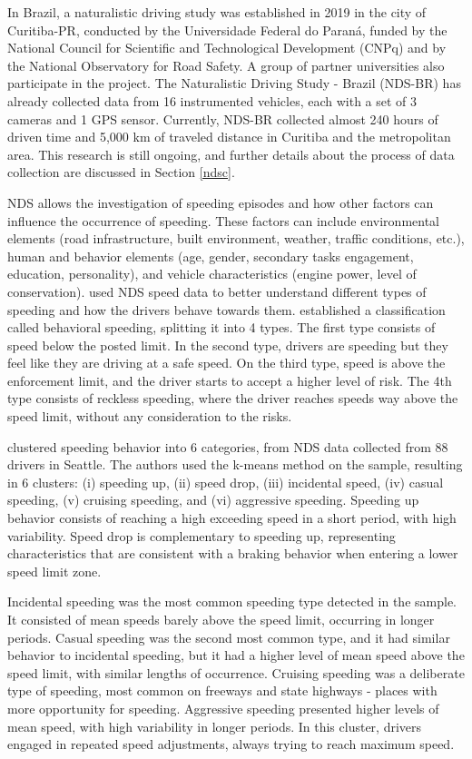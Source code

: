 In Brazil, a naturalistic driving study was established in 2019 in the city of Curitiba-PR, conducted by the Universidade Federal do Paraná, funded by the National Council for Scientific and Technological Development (CNPq) and by the National Observatory for Road Safety. A group of partner universities also participate in the project. The Naturalistic Driving Study - Brazil (NDS-BR) has already collected data from 16 instrumented vehicles, each with a set of 3 cameras and 1 GPS sensor. Currently, NDS-BR collected almost 240 hours of driven time and 5,000 km of traveled distance in Curitiba and the metropolitan area. This research is still ongoing, and further details about the process of data collection are discussed in Section \ref{ndsc}.

NDS allows the investigation of speeding episodes and how other factors can influence the occurrence of speeding. These factors can include environmental elements (road infrastructure, built environment, weather, traffic conditions, etc.), human and behavior elements (age, gender, secondary tasks engagement, education, personality),  and vehicle characteristics (engine power, level of conservation). \textcite{Richard2013,Richard2017, Richard2020} used NDS speed data to better understand different types of speeding and how the drivers behave towards them. \textcite{Richard2013} established a classification called behavioral speeding, splitting it into 4 types. The first type consists of speed below the posted limit. In the second type, drivers are speeding but they feel like they are driving at a safe speed. On the third type, speed is above the enforcement limit, and the driver starts to accept a higher level of risk. The 4th type consists of reckless speeding, where the driver reaches speeds way above the speed limit, without any consideration to the risks. 

\textcite{Richard2017} clustered speeding behavior into 6 categories, from NDS data collected from 88 drivers in Seattle. The authors used the k-means method on the sample, resulting in 6 clusters: (i) speeding up, (ii) speed drop, (iii) incidental speed, (iv) casual speeding, (v) cruising speeding, and (vi) aggressive speeding. Speeding up behavior consists of reaching a high exceeding speed in a short period, with high variability. Speed drop is complementary to speeding up, representing characteristics that are consistent with a braking behavior when entering a lower speed limit zone. 

Incidental speeding was the most common speeding type detected in the sample. It consisted of mean speeds barely above the speed limit, occurring in longer periods. Casual speeding was the second most common type, and it had similar behavior to incidental speeding, but it had a higher level of mean speed above the speed limit, with similar lengths of occurrence. Cruising speeding was a deliberate type of speeding, most common on freeways and state highways - places with more opportunity for speeding. Aggressive speeding presented higher levels of mean speed, with high variability in longer periods. In this cluster, drivers engaged in repeated speed adjustments, always trying to reach maximum speed.

